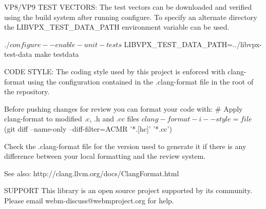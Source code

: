 \begin{DoxyVerbInclude}
VP8/VP9 TEST VECTORS:
  The test vectors can be downloaded and verified using the build system after
  running configure. To specify an alternate directory the
  LIBVPX_TEST_DATA_PATH environment variable can be used.

  $ ./configure --enable-unit-tests
  $ LIBVPX_TEST_DATA_PATH=../libvpx-test-data make testdata

CODE STYLE:
  The coding style used by this project is enforced with clang-format using the
  configuration contained in the .clang-format file in the root of the
  repository.

  Before pushing changes for review you can format your code with:
  # Apply clang-format to modified .c, .h and .cc files
  $ clang-format -i --style=file \
    $(git diff --name-only --diff-filter=ACMR '*.[hc]' '*.cc')

  Check the .clang-format file for the version used to generate it if there is
  any difference between your local formatting and the review system.

  See also: http://clang.llvm.org/docs/ClangFormat.html

SUPPORT
  This library is an open source project supported by its community. Please
  email webm-discuss@webmproject.org for help.

\end{DoxyVerbInclude}
 